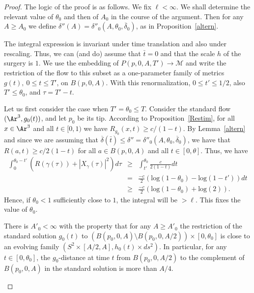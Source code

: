 \begin{proof}
The logic of the proof is as follows. We
fix $\ell<\infty$. We shall determine the relevant value of
$\theta_0$ and then of $A_0$ in the course of the argument. Then for any $A\ge A_0$
we define
 $\delta''(A)= \delta''_0(A,\theta_0,\overline\delta_0)$, as in
Proposition~\ref{altern}.

The integral expression is invariant under time translation and also
under rescaling. Thus, we can (and do) assume that $\bar t=0$ and
that the scale $h$ of the surgery is $1$. We use the embedding of
$P(p,0,A,T')\to {\mathcal M}$ and write the restriction of the flow
to this subset as a one-parameter family of metrics $g(t),\ 0\le
t\le T'$, on $B(p,0,A)$. With this renormalization, $0\le t'\le
1/2$, also $T'\le \theta_0$,  and $\tau=T'-t$.


Let us first consider the case when  $T'=\theta_0\le T$. Consider the
standard flow $(\Ar^3,g_0(t))$, and let $p_0$ be its tip. According
to Proposition~\ref{Restim},  for all $x\in \Ar^3$ and all $t\in
[0,1)$ we have $R_{g_0}(x,t)\ge c/(1-t)$. By Lemma~\ref{altern} and
since we are assuming that $\overline\delta(\bar t)\le \delta''=
\delta''_0(A,\theta_0,\overline\delta_0)$, we have that $R(a,t)\ge
c/2(1-t)$ for all $a\in B(p,0,A)$ and all $t\in [0,\theta]$. Thus,
 we have
\begin{eqnarray*}
\int_0^{\theta_0-t'}\left(R(\gamma(\tau))+|X_\gamma(\tau)|^2\right)d\tau
& \ge & \int_{t'}^{\theta_0}
\frac{c}{2(1-t)}dt \\
& = & \frac{-c}{2}\left(\mathrm{log}(1-\theta_0)-\mathrm{log}(1-t')\right)dt \\
& \ge &  \frac{-c}{2}\left(\mathrm{log}(1-\theta_0)+\mathrm{log}(2)\right).
\end{eqnarray*}
 Hence, if
$\theta_0<1$ sufficiently close to $1$, the  integral will be $> \ell$.
This fixes the value of $\theta_0$.

\begin{claim}
\label{claim:standard-solution-neck-at-infinity}
There is $A'_0<\infty$ with the property that for any $A\ge A'_0$
the restriction of the standard solution $g_0(t)$ to
$\left(B(p_0,0,A)\setminus B(p_0,0,A/2)\right)\times [0,\theta_0]$
is close to an evolving family $(S^2\times [A/2,A],h_0(t)\times
ds^2)$. In particular, for any $t\in [0,\theta_0]$, the
$g_0$-distance at time $t$ from $B(p_0,0,A/2)$ to the complement of
$B(p_0,0,A)$ in the standard solution is more than $A/4$.
\end{claim}


\end{proof}
